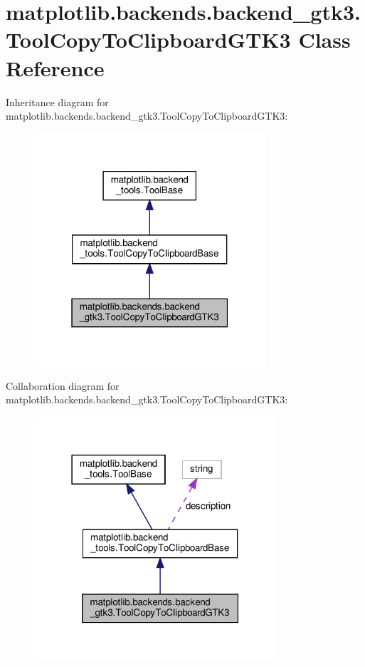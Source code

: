 \hypertarget{classmatplotlib_1_1backends_1_1backend__gtk3_1_1ToolCopyToClipboardGTK3}{}\section{matplotlib.\+backends.\+backend\+\_\+gtk3.\+Tool\+Copy\+To\+Clipboard\+G\+T\+K3 Class Reference}
\label{classmatplotlib_1_1backends_1_1backend__gtk3_1_1ToolCopyToClipboardGTK3}


Inheritance diagram for matplotlib.\+backends.\+backend\+\_\+gtk3.\+Tool\+Copy\+To\+Clipboard\+G\+T\+K3\+:
\nopagebreak
\begin{figure}[H]
\begin{center}
\leavevmode
\includegraphics[width=244pt]{classmatplotlib_1_1backends_1_1backend__gtk3_1_1ToolCopyToClipboardGTK3__inherit__graph}
\end{center}
\end{figure}


Collaboration diagram for matplotlib.\+backends.\+backend\+\_\+gtk3.\+Tool\+Copy\+To\+Clipboard\+G\+T\+K3\+:
\nopagebreak
\begin{figure}[H]
\begin{center}
\leavevmode
\includegraphics[width=255pt]{classmatplotlib_1_1backends_1_1backend__gtk3_1_1ToolCopyToClipboardGTK3__coll__graph}
\end{center}
\end{figure}
